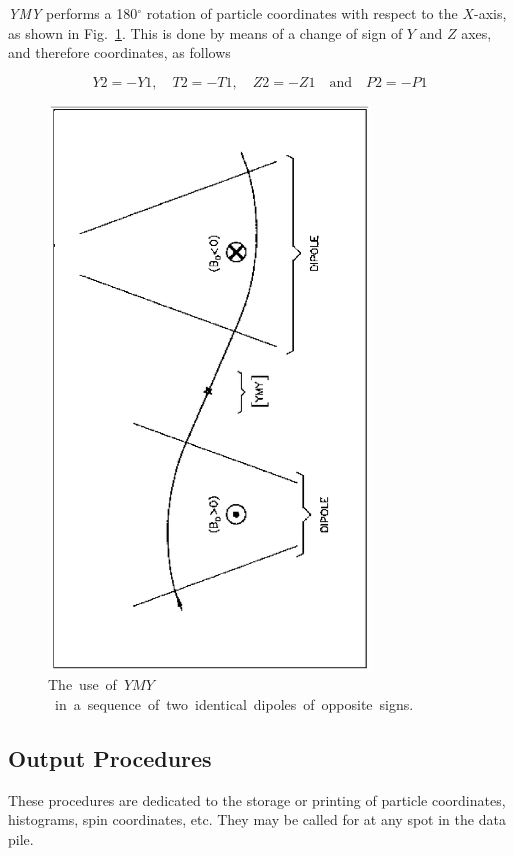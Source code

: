 \textsl{YMY}  performs a 180$^\circ$ rotation of particle coordinates with respect to the 
$ X $-axis, as shown  in Fig.~\ref{fig33}. 
This is done by means of a change of sign of $ Y $ and $ Z $ axes,  
and therefore coordinates, as follows 

$$ Y2=-Y1,\quad T2=-T1,\quad Z2=-Z1 \quad \text{and} \quad P2=-P1 $$

\vfill
\begin{figure}[H]
\centerline{\includegraphics[height=15cm,angle=-90]{Fig33.ps}}
\caption{\label{fig33}\mbox{The use of $ YMY $ in a sequence of two identical
dipoles of opposite signs.}}
\end{figure}
\vfill






\newpage  %

\subsection{Output Procedures} \label{sec4.5}

 These procedures are dedicated to the storage or printing of particle coordinates, 
histograms, spin coordinates, etc. They may be called for at any spot in the data pile. 





